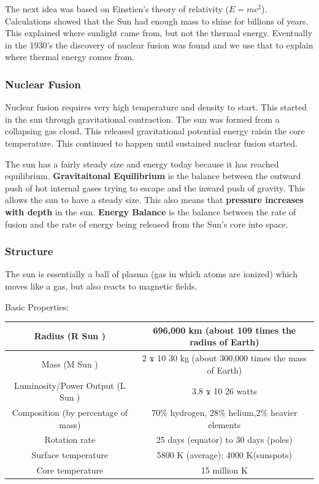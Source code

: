 \documentclass[12pt]{article}
\begin{document}
The next idea was based on Einstien's theory of relativity ($E=mc^2$). Calculations showed that the Sun had enough mass to shine for billions of years. This explained where sunlight came from, but not the thermal energy. Eventually in the  1930's the discovery of nuclear fusion was found and we use that to explain where thermal energy comes from.

\subsubsection{Nuclear Fusion}
Nuclear fusion requires very high temperature and density to start. This started in the sun through gravitational contraction. The sun was formed from a collapsing gas cloud. This released gravitational potential energy raisin the core temperature. This continued to happen until sustained nuclear fusion started.

The sun has a fairly steady size and energy today because it has reached equilibrium. \textbf{Gravitaitonal Equilibrium} is the balance between the outward push of hot internal gases trying to escape and the inward push of gravity. This allows the sun to have a steady size. This also means that \textbf{pressure increases with depth} in the sun. \textbf{Energy Balance} is the balance between the rate of fusion and the rate of energy being released from the Sun's core into space.

\subsubsection{Structure}
The sun is essentially a ball of plasma (gas in which atoms are ionized) which moves like a gas, but also reacts to magnetic fields.

Basic Properties:\\
\begin{tabular}{|c|c|}
\hline
Radius (R Sun ) & 696,000 km (about 109 times the radius of Earth)\\
\hline
Mass (M Sun )  & 2 ϫ 10 30 kg (about 300,000 times the mass of Earth)\\
\hline
Luminosity/Power Output (L Sun ) & 3.8 ϫ 10 26 watts\\
\hline
Composition (by percentage of mass) & 70\% hydrogen, 28\% helium,2\% heavier elements\\
\hline
Rotation rate & 25 days (equator) to 30 days (poles)\\
\hline
Surface temperature & 5800 K (average); 4000 K(sunspots)\\
\hline
Core temperature & 15 million K\\
\hline
\end{tabular}
\end{document}
